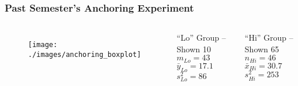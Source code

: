 %
%
%
%
%
\begin{frame}[t]
\frametitle{Past Semester's Anchoring Experiment}

\begin{columns}
	\begin{figure}
	\centering
	\texttt{[image: ./images/anchoring\_boxplot]}
	\end{figure}

	\begin{block}{``Lo'' Group -- Shown 10 }
	$m_{Lo} = 43$\\ $\bar{y}_{Lo} = 17.1$ \\ $s^2_{Lo} = 86$
\end{block}
		\begin{block}{``Hi'' Group -- Shown 65 }
		$n_{Hi} =46$\\ $\bar{x}_{Hi} = 30.7$\\ $s^2_{Hi} = 253$
\end{block}

\end{columns}
\end{frame}
